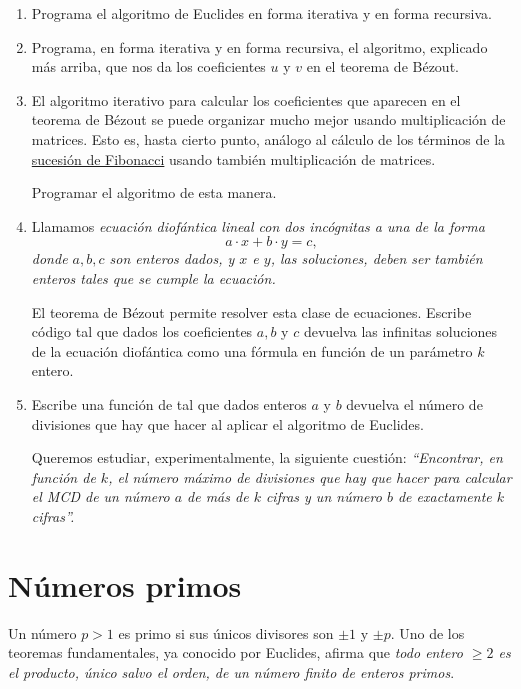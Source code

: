 \begin{ejer}
\begin{enumerate}
 \item Programa el algoritmo de Euclides en forma iterativa y en forma
recursiva. 
 \item Programa, en forma iterativa y en forma recursiva, el algoritmo,
explicado m\'as arriba,  que nos
da los coeficientes $u$ y $v$ en el teorema de Bézout.
\item El algoritmo iterativo para calcular los coeficientes que aparecen en el
teorema de Bézout se puede organizar mucho mejor usando multiplicaci\'on de
matrices. Esto es, hasta cierto punto, an\'alogo al c\'alculo de los t\'erminos
de la \hyperref[fib-matrices]{sucesi\'on de Fibonacci} usando tambi\'en
multiplicaci\'on de matrices. 

Programar el algoritmo de esta manera.


\item Llamamos {\itshape ecuaci\'on diof\'antica lineal con dos inc\'ognitas a
una de la forma 
\[a\cdot x+b\cdot y=c,\]
\noindent donde $a,b,c$ son enteros dados,  y $x$ e $y$, las soluciones, deben
ser tambi\'en enteros tales que se cumple la ecuaci\'on. }

El teorema de Bézout permite resolver esta clase de ecuaciones. Escribe c\'odigo
tal que dados los coeficientes $a,b$ y $c$ devuelva las infinitas soluciones de
la ecuaci\'on diof\'antica como una f\'ormula en funci\'on de un par\'ametro $k$
entero.

\item Escribe una funci\'on de {\sage} tal que dados enteros $a$ y $b$ devuelva
el n\'umero de divisiones que hay que hacer al aplicar el algoritmo de
Euclides. 

Queremos estudiar, experimentalmente,  la siguiente cuesti\'on: {\itshape
``Encontrar, en funci\'on
de $k$, el n\'umero m\'aximo de divisiones que hay que hacer para calcular el
MCD de un n\'umero $a$ de m\'as de $k$ cifras y un n\'umero $b$ de exactamente
$k$ cifras''.} 
\end{enumerate}
\end{ejer}


\section{N\'umeros primos}\label{primos}

Un n\'umero $p>1$ es primo si sus \'unicos divisores son $\pm 1$ y $\pm p$. Uno
de los teoremas fundamentales, ya conocido por Euclides, afirma que {\itshape
todo entero $\ge 2$ es el producto, \'unico salvo el orden, de un n\'umero
finito de enteros primos}.

